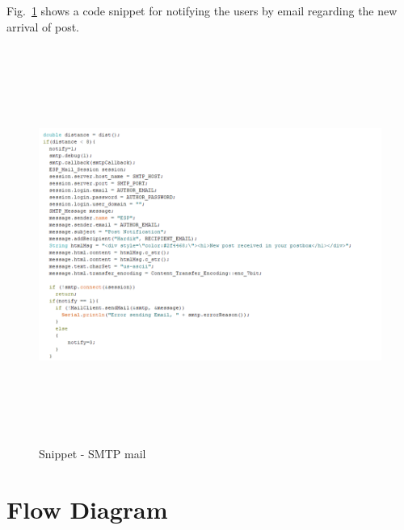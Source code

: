 Fig.~\ref{fig:SMTPmail} shows a code snippet for notifying the users by email regarding the new arrival of post.
\begin{figure}[htp]
    \centering
    \includegraphics[width=14cm, height=13cm]{image/SMTP_mail.png}
    \caption{Snippet - SMTP mail}
    \label{fig:SMTPmail}
\end{figure}

\section{Flow Diagram}

